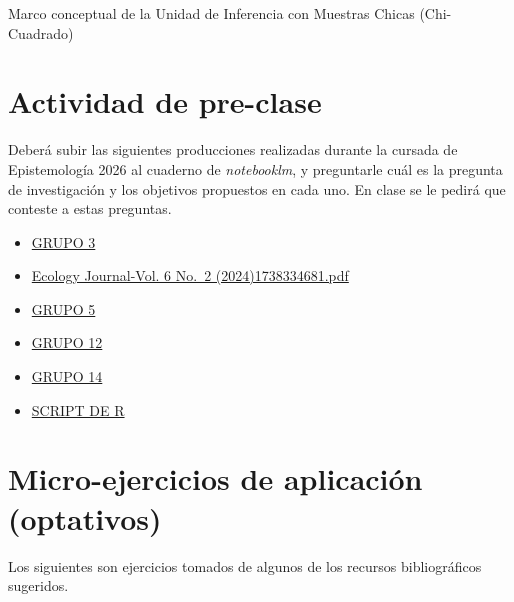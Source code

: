 \documentclass[
  spanish,
  letterpaper,
  DIV=11,
  numbers=noendperiod]{scrreprt}
\providecommand{\tightlist}{%
  \setlength{\itemsep}{0pt}\setlength{\parskip}{0pt}}
\begin{document}
Marco conceptual de la Unidad de Inferencia con Muestras Chicas
(Chi-Cuadrado)

\section{\texorpdfstring{\textbf{Actividad de
pre-clase}}{Actividad de pre-clase}}\label{actividad-de-pre-clase-3}

Deberá subir las siguientes producciones realizadas durante la cursada
de Epistemología 2026 al cuaderno de \emph{notebooklm}, y preguntarle
cuál es la pregunta de investigación y los objetivos propuestos en cada
uno. En clase se le pedirá que conteste a estas preguntas.

\begin{itemize}
\tightlist
\item
  \href{./TRABAJOS\%20EPIST/006_chi/Grupo\%203_Sem\%202_2026.docx}{GRUPO
  3}
\item
  \href{./TRABAJOS\%20EPIST/006_chi/Ecology\%20Journal-Vol.\%206\%20No.\%202\%20(2024)1738334681.pdf}{Ecology
  Journal-Vol. 6 No.~2 (2024)1738334681.pdf}
\item
  \href{./TRABAJOS\%20EPIST/006_chi/Grupo\%205_SEMINARIO\%202_22-06-26\%20(2).docx}{GRUPO
  5}
\item
  \href{./TRABAJOS\%20EPIST/006_chi/GRUPO\%2012_SEMINARIO2_2026.docx}{GRUPO
  12}
\item
  \href{./TRABAJOS\%20EPIST/006_chi/GRUPO\%2014_SEM2_2026.docx}{GRUPO
  14}
\item
  \href{./TRABAJOS\%20EPIST/006_chi/006_chi_2026.r}{SCRIPT DE R}
\end{itemize}

\section{Micro-ejercicios de aplicación
(optativos)}\label{micro-ejercicios-de-aplicaciuxf3n-optativos-6}

Los siguientes son ejercicios tomados de algunos de los recursos
bibliográficos sugeridos.
\end{document}
